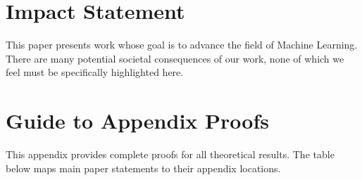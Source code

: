 \documentclass{article}
\theoremstyle{plain}
\theoremstyle{definition}
\theoremstyle{remark}
\begin{document}

\clearpage
\section*{Impact Statement}
This paper presents work whose goal is to advance the field of Machine Learning. There are many potential societal consequences of our work, none of which we feel must be specifically highlighted here.






\appendix
\onecolumn
\section*{Guide to Appendix Proofs}

This appendix provides complete proofs for all theoretical results. The table below maps main paper statements to their appendix locations.
\end{document}
